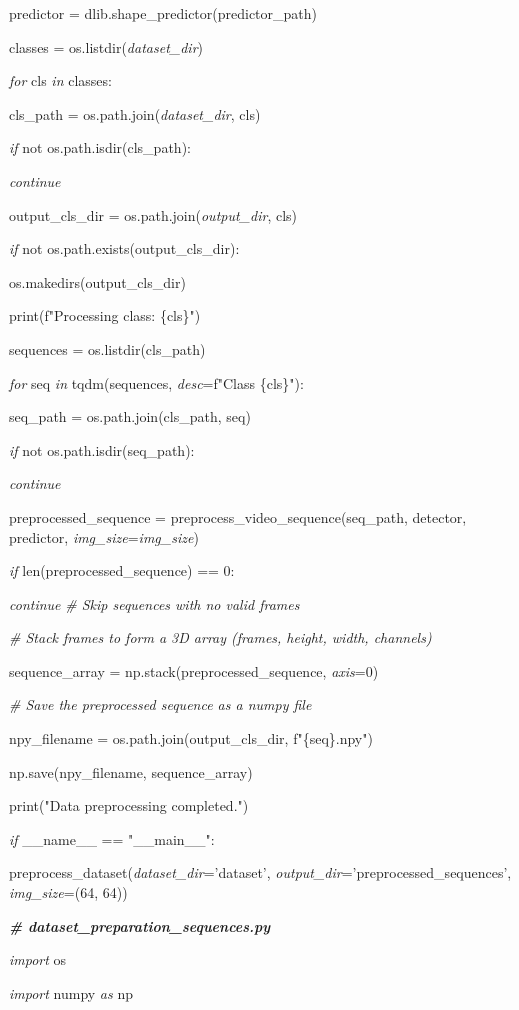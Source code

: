 \documentclass[
]{article}
\begin{document}
predictor = dlib.shape\_predictor(predictor\_path)

classes = os.listdir(\emph{dataset\_dir})

\emph{for} cls \emph{in} classes:

cls\_path = os.path.join(\emph{dataset\_dir}, cls)

\emph{if} not os.path.isdir(cls\_path):

\emph{continue}

output\_cls\_dir = os.path.join(\emph{output\_dir}, cls)

\emph{if} not os.path.exists(output\_cls\_dir):

os.makedirs(output\_cls\_dir)

print(f"Processing class: \{cls\}")

sequences = os.listdir(cls\_path)

\emph{for} seq \emph{in} tqdm(sequences, \emph{desc}=f"Class \{cls\}"):

seq\_path = os.path.join(cls\_path, seq)

\emph{if} not os.path.isdir(seq\_path):

\emph{continue}

preprocessed\_sequence = preprocess\_video\_sequence(seq\_path, detector, predictor, \emph{img\_size}=\emph{img\_size})

\emph{if} len(preprocessed\_sequence) == 0:

\emph{continue} \emph{\# Skip sequences with no valid frames}

\emph{\# Stack frames to form a 3D array (frames, height, width, channels)}

sequence\_array = np.stack(preprocessed\_sequence, \emph{axis}=0)

\emph{\# Save the preprocessed sequence as a numpy file}

npy\_filename = os.path.join(output\_cls\_dir, f"\{seq\}.npy")

np.save(npy\_filename, sequence\_array)

print("Data preprocessing completed.")

\emph{if} \_\_name\_\_ == "\_\_main\_\_":

preprocess\_dataset(\emph{dataset\_dir}='dataset', \emph{output\_dir}='preprocessed\_sequences', \emph{img\_size}=(64, 64))

\emph{\textbf{\# dataset\_preparation\_sequences.py}}

\emph{import} os

\emph{import} numpy \emph{as} np
\end{document}
